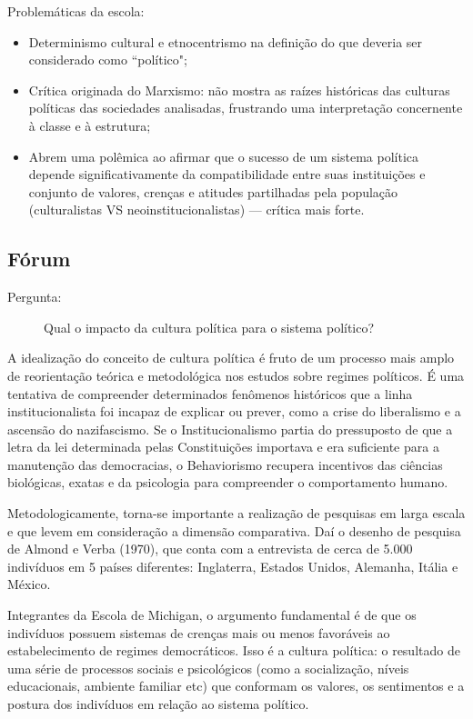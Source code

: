 \noindent Problemáticas da escola:

\begin{itemize}
    \item Determinismo cultural e etnocentrismo na definição do que deveria ser considerado como ``político";
    \item Crítica originada do Marxismo: não mostra as raízes históricas das culturas políticas das sociedades analisadas, frustrando uma interpretação concernente à classe e à estrutura;
    \item Abrem uma polêmica ao afirmar que o sucesso de um sistema política depende significativamente da compatibilidade entre suas instituições e conjunto de valores, crenças e atitudes partilhadas pela população (culturalistas VS neoinstitucionalistas) --- crítica mais forte.
\end{itemize}

\subsection{Fórum}

\begin{description}
    \item [Pergunta:] Qual o impacto da cultura política para o sistema político?
\end{description}

A idealização do conceito de cultura política é fruto de um processo mais amplo de reorientação teórica e metodológica nos estudos sobre regimes políticos. É uma tentativa de compreender determinados fenômenos históricos que a linha institucionalista foi incapaz de explicar ou prever, como a crise do liberalismo e a ascensão do nazifascismo. Se o Institucionalismo partia do pressuposto de que a letra da lei determinada pelas Constituições importava e era suficiente para a manutenção das democracias, o Behaviorismo recupera incentivos das ciências biológicas, exatas e da psicologia para compreender o comportamento humano.

Metodologicamente, torna-se importante a realização de pesquisas em larga escala e que levem em consideração a dimensão comparativa. Daí o desenho de pesquisa de Almond e Verba (1970), que conta com a entrevista de cerca de 5.000 indivíduos em 5 países diferentes: Inglaterra, Estados Unidos, Alemanha, Itália e México. 

Integrantes da Escola de Michigan, o argumento fundamental é de que os indivíduos possuem sistemas de crenças mais ou menos favoráveis ao estabelecimento de regimes democráticos. Isso é a cultura política: o resultado de uma série de processos sociais e psicológicos (como a socialização, níveis educacionais, ambiente familiar etc) que conformam os valores, os sentimentos e a postura dos indivíduos em relação ao sistema político.

